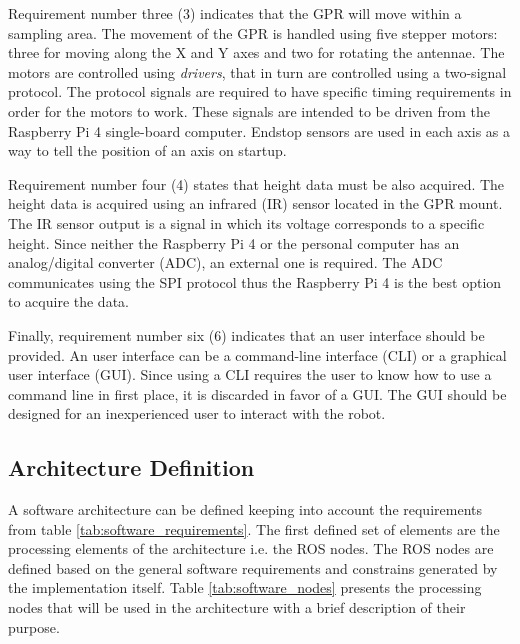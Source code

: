 \documentclass{article}
\begin{document}
Requirement number three (3) indicates that the GPR will move within a sampling area. The movement of the GPR is handled using five stepper motors: three for moving along the X and Y axes and two for rotating the antennae. The motors are controlled using \textit{drivers}, that in turn are controlled using a two-signal protocol. The protocol signals are required to have specific timing requirements in order for the motors to work. These signals are intended to be driven from the Raspberry Pi 4 single-board computer. Endstop sensors are used in each axis as a way to tell the position of an axis on startup.

Requirement number four (4) states that height data must be also acquired. The height data is acquired using an infrared (IR) sensor located in the GPR mount. The IR sensor output is a signal in which its voltage corresponds to a specific height. Since neither the Raspberry Pi 4 or the personal computer has an analog/digital converter (ADC), an external one is required. The ADC communicates using the SPI protocol thus the Raspberry Pi 4 is the best option to acquire the data.

Finally, requirement number six (6) indicates that an user interface should be provided. An user interface can be a command-line interface (CLI) or a graphical user interface (GUI). Since using a CLI requires the user to know how to use a command line in first place, it is discarded in favor of a GUI. The GUI should be designed for an inexperienced user to interact with the robot.

\subsection{Architecture Definition}
A software architecture can be defined keeping into account the requirements from table \ref{tab:software_requirements}. The first defined set of elements are the processing elements of the architecture i.e. the ROS nodes. The ROS nodes are defined based on the general software requirements and constrains generated by the implementation itself. Table \ref{tab:software_nodes} presents the processing nodes that will be used in the architecture with a brief description of their purpose.
\end{document}
